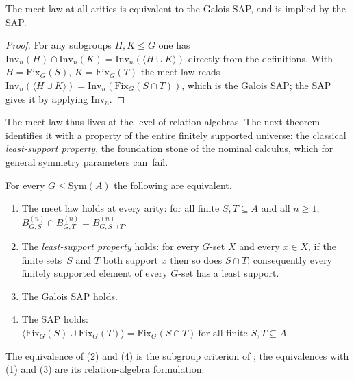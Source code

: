 \documentclass{lmcs}
\newcommand{\Sym}{\mathrm{Sym}}
\newcommand{\Fix}{\mathrm{Fix}}
\newcommand{\Inv}{\mathrm{Inv}}
\begin{document}
\begin{prop}\label{prop:sapmeet}
The meet law at all arities is equivalent to the Galois \textup{SAP},
and is implied by the \textup{SAP}.
\end{prop}
\begin{proof}
For any subgroups $H,K\leq G$ one has
$\Inv_n(H)\cap\Inv_n(K)=\Inv_n(\langle H\cup K\rangle)$ directly from
the definitions. With $H=\Fix_G(S)$, $K=\Fix_G(T)$ the meet law reads $\Inv_n(\langle H\cup K\rangle)=\Inv_n(\Fix_G(S\cap T))$, which is the Galois SAP; the SAP gives it by applying $\Inv_n$.
\end{proof}

The meet law thus lives at the level of relation algebras. The next
theorem identifies it with a
property of the entire finitely supported universe: the classical
\emph{least-support property}, the foundation stone of the nominal
calculus, which for general symmetry parameters can~fail.

\begin{thm}\label{thm:meetchar}
For every $G\leq\Sym(A)$ the following are equivalent.
\begin{enumerate}[label=\textup{(\arabic*)}]
\item The meet law holds at every arity: for all finite
$S,T\subseteq A$ and all $n\geq1$,
$B^{(n)}_{G,S}\cap B^{(n)}_{G,T}=B^{(n)}_{G,S\cap T}$.
\item The \emph{least-support property} holds: for every $G$-set $X$
and every $x\in X$, if the finite sets~$S$ and $T$ both support $x$
then so does $S\cap T$; consequently every finitely supported element
of every $G$-set has a least support.
\item The Galois \textup{SAP} holds.
\item The \textup{SAP} holds: \
$\bigl\langle\Fix_G(S)\cup\Fix_G(T)\bigr\rangle =\Fix_G(S\cap T)
\ \text{for all finite }S,T\subseteq A$.
\end{enumerate}
The equivalence of \textup{(2)} and \textup{(4)} is the subgroup criterion of \cite[Fact~9.2]{BKL14}; the equivalences with \textup{(1)} and \textup{(3)} are its relation-algebra formulation.
\end{thm}
\end{document}

